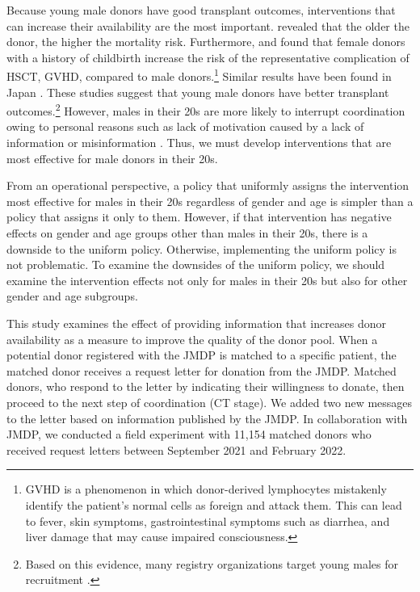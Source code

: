 \documentclass[12pt, a4paper]{article}
\begin{document}
Because young male donors have good transplant outcomes, interventions that can increase their availability are the most important. \citet{Kollman2016} revealed that the older the donor, the higher the mortality risk. Furthermore, \citet{Loren2006} and \citet{Kollman2016} found that female donors with a history of childbirth increase the risk of the representative complication of HSCT, GVHD, compared to male donors.\footnote{GVHD is a phenomenon in which donor-derived lymphocytes mistakenly identify the patient's normal cells as foreign and attack them. This can lead to fever, skin symptoms, gastrointestinal symptoms such as diarrhea, and liver damage that may cause impaired consciousness.} Similar results have been found in Japan \citep{Arai2016, Shinohara2017}. These studies suggest that young male donors have better transplant outcomes.\footnote{Based on this evidence, many registry organizations target young males for recruitment \citep{Fingrut2018}.} However, males in their 20s are more likely to interrupt coordination owing to personal reasons such as lack of motivation caused by a lack of information or misinformation \citep{Hirakawa2018, Kurosawa2022}. Thus, we must develop interventions that are most effective for male donors in their 20s.

From an operational perspective, a policy that uniformly assigns the intervention most effective for males in their 20s regardless of gender and age is simpler than a policy that assigns it only to them. However, if that intervention has negative effects on gender and age groups other than males in their 20s, there is a downside to the uniform policy. Otherwise, implementing the uniform policy is not problematic. To examine the downsides of the uniform policy, we should examine the intervention effects not only for males in their 20s but also for other gender and age subgroups.

This study examines the effect of providing information that increases donor availability as a measure to improve the quality of the donor pool. When a potential donor registered with the JMDP is matched to a specific patient, the matched donor receives a request letter for donation from the JMDP. Matched donors, who respond to the letter by indicating their willingness to donate, then proceed to the next step of coordination (CT stage). We added two new messages to the letter based on information published by the JMDP. In collaboration with JMDP, we conducted a field experiment with 11,154 matched donors who received request letters between September 2021 and February 2022.
\end{document}
